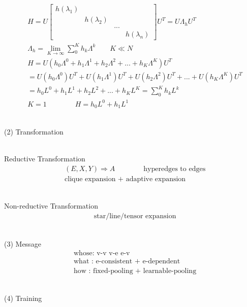 \documentclass{article}
\begin{document}
\begin{align*}
    & H = 
        U
        \begin{bmatrix}
            h \left ( \lambda_{1} \right ) &  &  & \\
            &  h \left ( \lambda_{2} \right ) &  & \\
            &  &  ... & \\
            &  &  & h \left ( \lambda_{n} \right )
        \end{bmatrix}
        U^{T}
        = 
        U \Lambda_{h} U^{T}  \\[3pt]
    & \Lambda_{h} = 
        \lim_{K \to \infty} \sum_{0}^{K} h_{k} \Lambda^{k} \qquad K \ll N  \\[3pt]
    & H = U
    \left (
    h_{0} \Lambda^{0} +
    h_{1} \Lambda^{1} +
    h_{2} \Lambda^{2} +
    ... +
    h_{K} \Lambda^{K}
    \right )
    U^{T}  \\[3pt]
    &= 
    U \left ( h_{0} \Lambda^{0} \right ) U^{T} +
    U \left ( h_{1} \Lambda^{1} \right ) U^{T} +
    U \left ( h_{2} \Lambda^{2} \right ) U^{T} +
    ... +
    U \left ( h_{K} \Lambda^{K} \right ) U^{T} \\[3pt]
    &=
    h_{0} L^{0} +
    h_{1} L^{1} +
    h_{2} L^{2} +
    ... +
    h_{K} L^{K}
    = 
    \sum_{0}^{K} h_{k} L^{k} \\[3pt]
    & K = 1 \qquad \qquad
    H = 
h_{0} L^{0} +
h_{1} L^{1}
\end{align*}


~ \\[3pt]
(2) Transformation

~ \\[3pt]
Reductive Transformation
\begin{align*}
    & ( E, X, Y ) \Rightarrow A 
    \qquad \qquad 
    \text{hyperedges to edges} \\[3pt]
    & \text{clique expansion + adaptive expansion}
\end{align*}

~ \\[3pt]
Non-reductive Transformation
\begin{align*}
    & \text{star/line/tensor expansion}
\end{align*}


~ \\[3pt]
(3) Message
\begin{align*}
    & \text{whose: v-v \ v-e \ e-v} \\[3pt]
    & \text{what : e-consistent + e-dependent} \\[3pt]
    & \text{how  : fixed-pooling + learnable-pooling} 
\end{align*}


~ \\[3pt]
(4) Training
\end{document}
